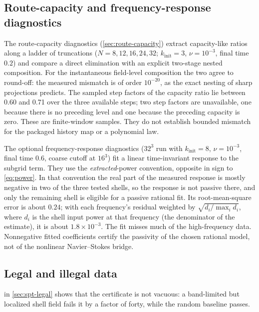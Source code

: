 \subsection{Route-capacity and frequency-response diagnostics}

The route-capacity diagnostics (\cref{sec:route-capacity}) extract capacity-like ratios along a
ladder of truncations ($N=8,12,16,24,32$; $k_{\mathrm{init}}=3$, $\nu=10^{-3}$, final time $0.2$) and compare a direct elimination with an explicit
two-stage nested composition. For the instantaneous field-level composition the two agree to
round-off: the measured mismatch is of order $10^{-20}$, as the exact nesting of sharp projections
predicts. The sampled step factors of the capacity ratio lie between 0.60 and 0.71 over
the three available steps; two step factors are unavailable, one because there is no preceding
level and one because the preceding capacity is zero. These are finite-window samples. They do not
establish bounded mismatch for the packaged history map or a polynomial law.

The optional frequency-response diagnostics ($32^3$ run with $k_{\mathrm{init}}=8$, $\nu=10^{-3}$, final
time $0.6$, coarse cutoff at $16^3$) fit a linear time-invariant response to the subgrid term. They use the \emph{extracted}-power convention, opposite in sign to \eqref{eq:power}. In that
convention the real part of the measured response is mostly negative in two of the three tested
shells, so the response is not passive there, and only the remaining shell is eligible for a
passive rational fit. Its root-mean-square
error is about $0.24$; with each frequency's residual weighted by $\sqrt{d_i/\max_i d_i}$, where $d_i$
is the shell input power at that frequency (the denominator of the estimate), it is about $1.8\times10^{-3}$. The fit misses much of the high-frequency data. Nonnegative fitted coefficients certify the
passivity of the chosen rational model, not of the nonlinear Navier--Stokes bridge.

\subsection{Legal and illegal data}

 in \cref{sec:spt-legal} shows that the certificate is not vacuous: a
band-limited but localized shell field fails it by a factor of forty, while the random baseline
passes.
